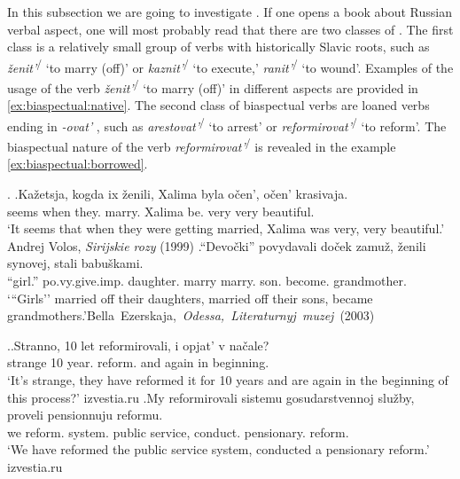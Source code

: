 In this subsection we are going to investigate . If one opens a book about Russian verbal aspect, one will most probably read that there are two classes of . The first class is a relatively small group of verbs with historically Slavic roots, such as \textit{\v{z}enit'}\textsuperscript{\PF\slash\IPF} `to marry (off)' or \textit{kaznit'}\textsuperscript{\PF\slash\IPF} `to execute,' \textit{ranit'}\textsuperscript{\PF\slash\IPF} `to wound'. Examples of the usage of the verb \textit{\v{z}enit'}\textsuperscript{\PF\slash\IPF} `to marry (off)' in different aspects are provided in \ref{ex:biaspectual:native}. The second class of biaspectual verbs  are loaned   verbs ending in \textit{-ovat'}  , such as \textit{arestovat'}\textsuperscript{\PF\slash\IPF} `to arrest' or \textit{reformirovat'}\textsuperscript{\PF\slash\IPF} `to reform'. The biaspectual nature  of the verb \textit{reformirovat'}\textsuperscript{\PF\slash\IPF} is revealed in the example \ref{ex:biaspectual:borrowed}. 

\ex.\label{ex:biaspectual:native}
\ag.Ka\v{z}etsja, kogda ix \v{z}enili\textsuperscript{\IPF}, Xalima byla o\v{c}en', o\v{c}en' krasivaja.\\
seems when they. marry. Xalima be. very very beautiful.\\
\trans `It seems that when they were getting married, Xalima was very, very beautiful.' \hfill Andrej Volos, \textit{Sirijskie rozy} (1999)
\bg.``Devo\v{c}ki'' povydavali do\v{c}ek zamu\v{z}, \v{z}enili\textsuperscript{\PF} synovej, stali babu\v{s}kami.\\
``girl.'' po.vy.give.imp. daughter. marry marry. son. become. grandmother.\\
\trans `{``}Girls'' married off their daughters, married off their sons, became grandmothers.'\hfill\hbox{Bella Ezerskaja, \textit{Odessa, Literaturnyj muzej} (2003)}

\ex.\label{ex:biaspectual:borrowed}\ag.Stranno, 10 let reformirovali\textsuperscript{\IPF}, i opjat' v na\v{c}ale?\\
strange 10 year. reform. and again in beginning.\\
\trans `It's strange, they have reformed it for 10 years and are again in the beginning of this process?'
\hfill izvestia.ru
\bg.My reformirovali\textsuperscript{\PF} sistemu gosudarstvennoj slu\v{z}by, proveli pensionnuju reformu.\\
we reform. system. public service, conduct. pensionary. reform.\\
\trans `We have reformed the public service system, conducted a pensionary reform.'
\hfill izvestia.ru

